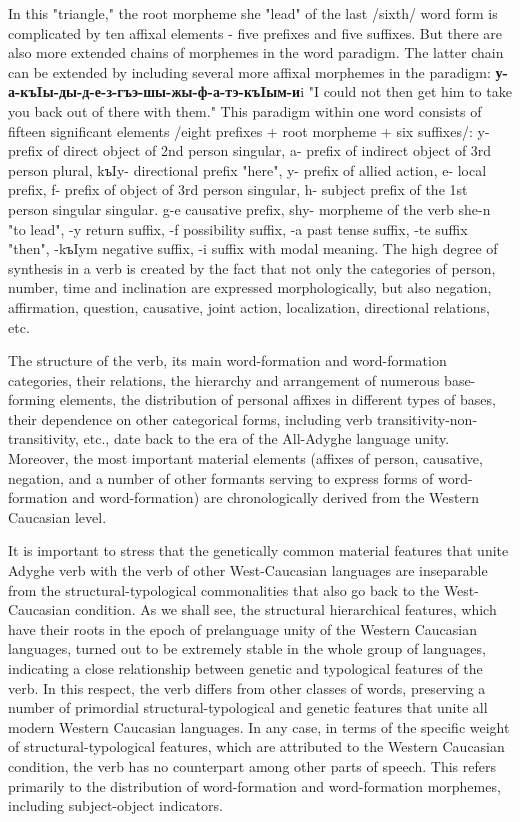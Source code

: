 \documentclass[a4paper,12pt]{book}
\newcommand{\1}[1]{\textbf{\emph{#1}}} %
\newcommand{\2}[1]{\textbf{[#1]}} %
\newcommand{\3}[1]{\fontsize{11pt}{0cm}\textbf{\emph{#1}}} %
\newcommand{\4}[1]{\fontsize{10pt}{0cm}\emph{#1}}	%
\newcommand{\5}[1]{\textbf{/#1/}} %
\newcommand{\6}[1]{\textbf{[#1]}} %
\newcommand{\7}[1]{\fontsize{12pt}{0cm}\emph{#1}} %
\newcommand{\8}[1]{\fontsize{12pt}{0cm}`#1'} %
\newcommand{\9}[1]{\fontsize{12pt}{0cm}(lit. `#1')} %
\begin{document}
In this "triangle," the root morpheme she "lead" of the last /sixth/ word form is complicated by ten affixal elements - five prefixes and five suffixes. But there are also more extended chains of morphemes in the word paradigm. The latter chain can be extended by including several more affixal morphemes in the paradigm: \textbf{у-а-къIы-ды-д-е-з-гъэ-шы-жы-ф-а-тэ-къIым-и}i "I could not then get him to take you back out of there with them." This paradigm within one word consists of fifteen significant elements /eight prefixes + root morpheme + six suffixes/: y- prefix of direct object of 2nd person singular, a- prefix of indirect object of 3rd person plural, kъIy- directional prefix "here", y- prefix of allied action, e- local prefix, f- prefix of object of 3rd person singular, h- subject prefix of the 1st person singular singular. g-e causative prefix, shy- morpheme of the verb she-n "to lead", -y return suffix, -f possibility suffix, -a past tense suffix, -te suffix "then", -kъIym negative suffix, -i suffix with modal meaning. The high degree of synthesis in a verb is created by the fact that not only the categories of person, number, time and inclination are expressed morphologically, but also negation, affirmation, question, causative, joint action, localization, directional relations, etc.

The structure of the verb, its main word-formation and word-formation categories, their relations, the hierarchy and arrangement of numerous base-forming elements, the distribution of personal affixes in different types of bases, their dependence on other categorical forms, including verb transitivity-non-transitivity, etc., date back to the era of the All-Adyghe language unity. Moreover, the most important material elements (affixes of person, causative, negation, and a number of other formants serving to express forms of word-formation and word-formation) are chronologically derived from the Western Caucasian level.

It is important to stress that the genetically common material features that unite Adyghe verb with the verb of other West-Caucasian languages are inseparable from the structural-typological commonalities that also go back to the West-Caucasian condition. As we shall see, the structural hierarchical features, which have their roots in the epoch of prelanguage unity of the Western Caucasian languages, turned out to be extremely stable in the whole group of languages, indicating a close relationship between genetic and typological features of the verb. In this respect, the verb differs from other classes of words, preserving a number of primordial structural-typological and genetic features that unite all modern Western Caucasian languages. In any case, in terms of the specific weight of structural-typological features, which are attributed to the Western Caucasian condition, the verb has no counterpart among other parts of speech. This refers primarily to the distribution of word-formation and word-formation morphemes, including subject-object indicators.
\end{document}
